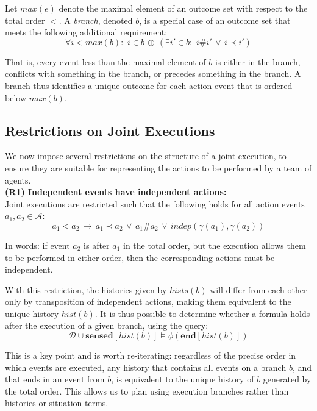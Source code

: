 Let $max(e)$ denote the maximal element of an outcome set with respect
to the total order $<$. A \emph{branch}, denoted $b$, is a special
case of an outcome set that meets the following additional requirement:\[
\forall i<max(b):\,\, i\in b\,\oplus\,(\exists i'\in b:\,\, i\#i'\,\vee\, i\prec i')\]


That is, every event less than the maximal element of $b$ is either
in the branch, conflicts with something in the branch, or precedes
something in the branch. A branch thus identifies a unique outcome
for each action event that is ordered below $max(b)$.


\subsection{Restrictions on Joint Executions}

\label{sub:Restrictions}

We now impose several restrictions on the structure of a joint execution,
to ensure they are suitable for representing the actions to be performed
by a team of agents.\\


\textbf{(R1) Independent events have independent actions:}\\
 Joint executions are restricted such that the following holds for
all action events $a_{1},a_{2}\in\mathcal{A}$:\[
a_{1}<a_{2}\,\rightarrow\, a_{1}\prec a_{2}\,\vee\, a_{1}\#a_{2}\,\vee\, indep(\gamma(a_{1}),\gamma(a_{2}))\]


In words: if event $a_{2}$ is after $a_{1}$ in the total order,
but the execution allows them to be performed in either order, then
the corresponding actions must be independent.

With this restriction, the histories given by $hists(b)$ will differ
from each other only by transposition of independent actions, making
them equivalent to the unique history $hist(b)$. It is thus possible
to determine whether a formula holds after the execution of a given
branch, using the query:\[
\mathcal{D}\cup\mathbf{sensed}[hist(b)]\models\phi(\mathbf{end}[hist(b)])\]


This is a key point and is worth re-iterating: regardless of the precise
order in which events are executed, any history that contains all
events on a branch $b$, and that ends in an event from $b$, is equivalent
to the unique history of $b$ generated by the total order. This allows
us to plan using execution branches rather than histories or situation
terms.\\


